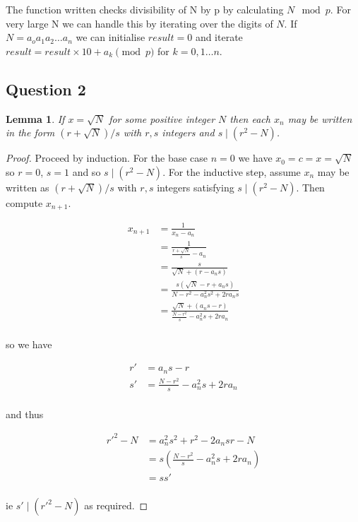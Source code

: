 \documentclass[10pt,a4paper]{report}
\newtheorem*{lemma}{Lemma}
\begin{document}
The function written checks divisibility of N by p by calculating $N \mod p$. For very large N we can handle this by iterating over the digits of $N$. If $N=a_oa_1a_2\dots a_n$ we can initialise $result=0$ and iterate $result=result\times10+a_k\pmod p$ for $k=0,1\dots n$.	

\subsection*{Question 2}

\begin{lemma}
If $x =\sqrt{N}$ for some positive integer $N$ then each $x_n$ may be written in the form $(r +\sqrt{N})/s$ with $r, s$ integers and $s \mid (r^
2 - N)$.
\end{lemma}

\begin{proof}

Proceed by induction. For the base case $n=0$ we have $x_0=c=x=\sqrt{N}$ so $r=0$, $s=1$ and so $s \mid (r^2 - N)$. For the inductive step, assume $x_n$ may be written as $(r +\sqrt{N})/s$ with $r,s$ integers satisfying $s \mid (r^2 - N)$. Then compute $x_{n+1}$. 

\begin{align*}
x_{n+1} &= \frac{1}{x_n-a_n}\\
		&= \frac{1}{\frac{r+\sqrt{N}}{s}-a_n}\\
		&= \frac{s}{\sqrt{N}+(r-a_ns)}\\
		&= \frac{s(\sqrt{N}-r+a_ns)}{N-r^2-a_n^2s^2+2ra_ns}\\
		&= \frac{\sqrt{N}+(a_ns-r)}{\frac{N-r^2}{s}-a_n^2s+2ra_n}\\
\end{align*}

so we have 

\begin{align*}
r' &= a_ns-r\\
s'	&= \frac{N-r^2}{s}-a_n^2s+2ra_n\\
\end{align*}

and thus 

\begin{align*}
r'^2-N &= a_n^2s^2+r^2-2a_nsr-N\\
	&= s(\frac{N-r^2}{s}-a_n^2s+2ra_n)\\
	&= ss'\\
\end{align*}

ie $s' \mid (r'^2 - N)$ as required.

\end{proof}
\end{document}
